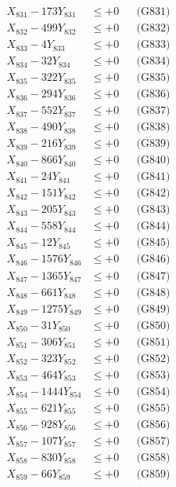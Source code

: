 \documentclass[a4paper,10pt]{article}
\begin{document}
{\begin{align}
\allowbreak
X_{831} - 173Y_{831} &\leq +0 && \text{(G831)} \\
X_{832} - 499Y_{832} &\leq +0 && \text{(G832)} \\
X_{833} - 4Y_{833} &\leq +0 && \text{(G833)} \\
X_{834} - 32Y_{834} &\leq +0 && \text{(G834)} \\
X_{835} - 322Y_{835} &\leq +0 && \text{(G835)} \\
X_{836} - 294Y_{836} &\leq +0 && \text{(G836)} \\
X_{837} - 552Y_{837} &\leq +0 && \text{(G837)} \\
X_{838} - 490Y_{838} &\leq +0 && \text{(G838)} \\
X_{839} - 216Y_{839} &\leq +0 && \text{(G839)} \\
X_{840} - 866Y_{840} &\leq +0 && \text{(G840)} \\
\allowbreak
X_{841} - 24Y_{841} &\leq +0 && \text{(G841)} \\
X_{842} - 151Y_{842} &\leq +0 && \text{(G842)} \\
X_{843} - 205Y_{843} &\leq +0 && \text{(G843)} \\
X_{844} - 558Y_{844} &\leq +0 && \text{(G844)} \\
X_{845} - 12Y_{845} &\leq +0 && \text{(G845)} \\
X_{846} - 1576Y_{846} &\leq +0 && \text{(G846)} \\
X_{847} - 1365Y_{847} &\leq +0 && \text{(G847)} \\
X_{848} - 661Y_{848} &\leq +0 && \text{(G848)} \\
X_{849} - 1275Y_{849} &\leq +0 && \text{(G849)} \\
X_{850} - 31Y_{850} &\leq +0 && \text{(G850)} \\
\allowbreak
X_{851} - 306Y_{851} &\leq +0 && \text{(G851)} \\
X_{852} - 323Y_{852} &\leq +0 && \text{(G852)} \\
X_{853} - 464Y_{853} &\leq +0 && \text{(G853)} \\
X_{854} - 1444Y_{854} &\leq +0 && \text{(G854)} \\
X_{855} - 621Y_{855} &\leq +0 && \text{(G855)} \\
X_{856} - 928Y_{856} &\leq +0 && \text{(G856)} \\
X_{857} - 107Y_{857} &\leq +0 && \text{(G857)} \\
X_{858} - 830Y_{858} &\leq +0 && \text{(G858)} \\
X_{859} - 66Y_{859} &\leq +0 && \text{(G859)} \\

\end{align}}
\end{document}
